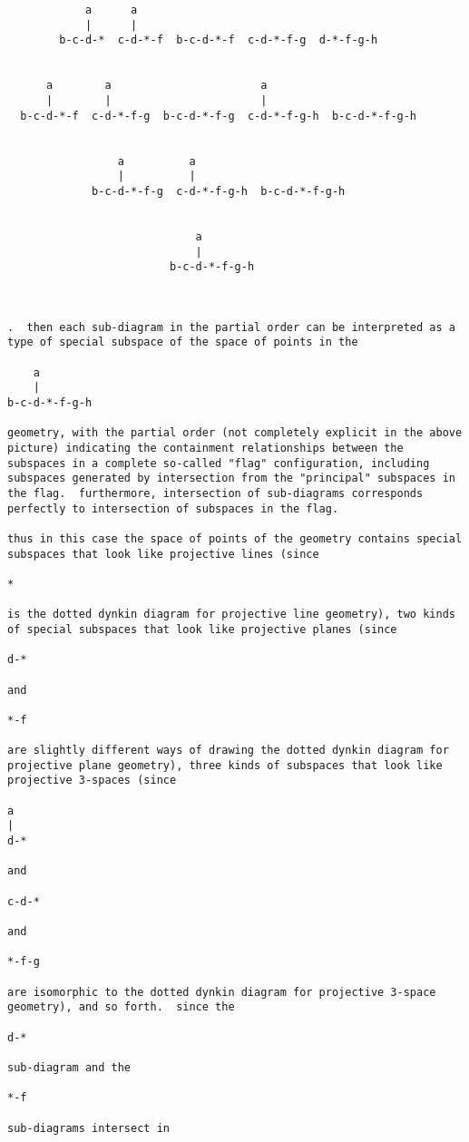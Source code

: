 \begin{verbatim}
            a      a
            |      |
        b-c-d-*  c-d-*-f  b-c-d-*-f  c-d-*-f-g  d-*-f-g-h


      a        a                       a
      |        |                       |
  b-c-d-*-f  c-d-*-f-g  b-c-d-*-f-g  c-d-*-f-g-h  b-c-d-*-f-g-h


                 a          a
                 |          |
             b-c-d-*-f-g  c-d-*-f-g-h  b-c-d-*-f-g-h


                             a
                             |
                         b-c-d-*-f-g-h



.  then each sub-diagram in the partial order can be interpreted as a
type of special subspace of the space of points in the

    a
    |
b-c-d-*-f-g-h

geometry, with the partial order (not completely explicit in the above
picture) indicating the containment relationships between the
subspaces in a complete so-called "flag" configuration, including
subspaces generated by intersection from the "principal" subspaces in
the flag.  furthermore, intersection of sub-diagrams corresponds
perfectly to intersection of subspaces in the flag.

thus in this case the space of points of the geometry contains special
subspaces that look like projective lines (since

*

is the dotted dynkin diagram for projective line geometry), two kinds
of special subspaces that look like projective planes (since

d-*

and

*-f

are slightly different ways of drawing the dotted dynkin diagram for
projective plane geometry), three kinds of subspaces that look like 
projective 3-spaces (since

a
|
d-*

and

c-d-*

and

*-f-g

are isomorphic to the dotted dynkin diagram for projective 3-space
geometry), and so forth.  since the

d-*

sub-diagram and the

*-f

sub-diagrams intersect in


\end{verbatim}

